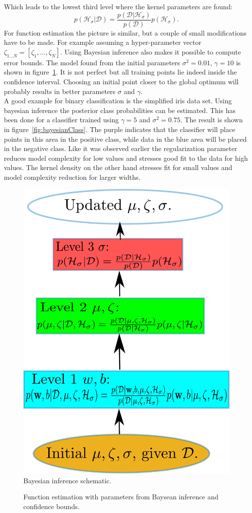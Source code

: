 Which leads to the lowest third level where the kernel parameters are found:
\begin{equation}
p(\mathcal{H}_\sigma|\mathcal{D}) = \frac{p(\mathcal{D}|\mathcal{H}_\sigma)}{p(\mathcal{D})} p(\mathcal{H}_\sigma).
\end{equation}
For function estimation the picture is similar, but a couple of small modifications have to be made. For example assuming a hyper-parameter vector $\zeta_{1\dots N} = [\zeta_1,\dots,\zeta_N]$.
Using Bayesian inference also makes it possible to compute error bounds. The model found from the initial parameters $\sigma^2 = 0.01$, $\gamma = 10$ is shown in figure~\ref{fig:bayesianInf}. It is not perfect but all training points lie indeed inside the confidence interval. Choosing an initial point closer to the global optimum will probably results in better parameters $\sigma$ and $\gamma$. \\
A good example for binary classification is the simplified iris data set. Using bayesian inference the posterior class probabilities can be estimated. This has been done for a classifier trained using $\gamma = 5$ and $\sigma^2 = 0.75$. The result is shown in figure~\ref{fig:bayesianClass}. The purple indicates that the classifier will place points in this area in the positive class, while data in the blue area will be placed in the negative class. Like it was observed earlier the regularization parameter reduces model complexity for low values and stresses good fit to the data for high values. The kernel density on the other hand stresses fit for small values and model complexity reduction for larger widths. \\
\begin{figure}
\centering
\includegraphics[width=0.25\linewidth]{../src/figure/bayesianInf}
\caption{Bayesian inference schematic.}
\label{fig:bayesianInf}
\end{figure}
\begin{figure}
\centering
%

\caption{Function estimation with parameters from Baysean inference and confidence bounds.}
\label{fig:bayesianInfWconf}
\end{figure}
